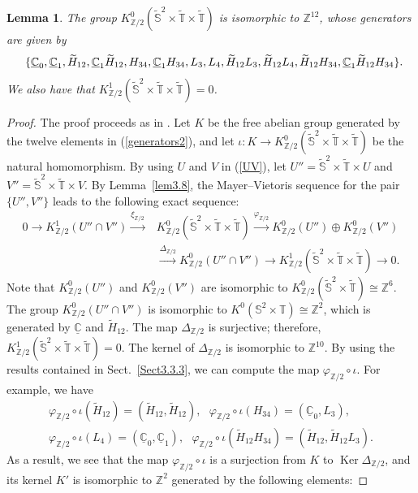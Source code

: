 \documentclass{amsart}
\theoremstyle{plain}
\newtheorem{lemma}[theorem]{Lemma}
\theoremstyle{definition}
\theoremstyle{remark}
\newcommand{\Z}{\mathbb{Z}}
\newcommand{\C}{\mathbb{C}}
\newcommand{\T}{\mathbb{T}}
\newcommand{\SSS}{\mathbb{S}}
\newcommand{\tT}{\widetilde{\T}}
\newcommand{\tS}{\widetilde{\SSS}}
\newcommand{\tH}{\widetilde{H}}
\newcommand{\uC}{\underline{\C}}
\DeclareMathOperator{\Ker}{\mathrm{Ker}}
\begin{document}
\begin{lemma}
\label{S2S1S1}
The group $K^0_{\Z/2}(\tS^2 \times \tT \times \tT)$ is isomorphic to $\Z^{12}$, whose generators are given by
\begin{equation}
\label{generators2}
	\{ \uC_0, \uC_1, \tH_{12}, \uC_1\tH_{12}, H_{34}, \uC_1H_{34}, L_3, L_4,
	\tH_{12} L_3, \tH_{12} L_4, \tH_{12} H_{34}, \uC_1 \tH_{12} H_{34}\}. \hspace{-2mm}
\end{equation}
We also have that
$K^1_{\Z/2}(\tS^2 \times \tT \times \tT) = 0$.
\end{lemma}

\begin{proof}
The proof proceeds as in \cite[Lemma~4.4]{Gomi15}.
Let $K$ be the free abelian group generated by the twelve elements in (\ref{generators2}), and let $\iota \colon K \to K^0_{\Z/2}(\tS^2 \times \tT \times \tT)$ be the natural homomorphism.
By using $U$ and $V$ in (\ref{UV}), let $U'' = \tS^2 \times \tT \times U$ and $V'' = \tS^2 \times \tT \times V$.
By Lemma~\ref{lem3.8}, the Mayer--Vietoris sequence for the pair $\{ U'', V'' \}$ leads to the following exact sequence:
\begin{align*}
0 \to K^1_{\Z/2}(U'' \cap V'') \overset{\xi_{\Z/2}}{\longrightarrow} &K^0_{\Z/2}(\tS^2 \times \tT \times \tT) \overset{\varphi_{\Z/2}}{\longrightarrow} K^0_{\Z/2}(U'') \oplus K^0_{\Z/2}(V'')\\
	&\overset{\Delta_{\Z/2}}{\longrightarrow} K^0_{\Z/2}(U'' \cap V'') \to K^1_{\Z/2}(\tS^2 \times \tT \times \tT) \to 0.
\end{align*}
Note that $K^0_{\Z/2}(U'')$ and $K^0_{\Z/2}(V'')$ are isomorphic to $K^0_{\Z/2}(\tS^2 \times \tT) \cong \Z^6$.
The group $K^0_{\Z/2}(U'' \cap V'')$ is isomorphic to $K^0(\SSS^2 \times \T) \cong \Z^2$, which is generated by $\uC$ and $\tH_{12}$.
The map $\Delta_{\Z/2}$ is surjective; therefore, $K^1_{\Z/2}(\tS^2 \times \tT \times \tT) = 0$.
The kernel of $\Delta_{\Z/2}$ is isomorphic to $\Z^{10}$.
By using the results contained in Sect.~\ref{Sect3.3.3}, we can compute the map $\varphi_{\Z/2} \circ \iota$.
For example, we have
\begin{gather*}
	\varphi_{\Z/2} \circ \iota(\tH_{12}) = (\tH_{12}, \tH_{12}), \ \ \
	\varphi_{\Z/2} \circ \iota(H_{34}) = (\uC_0, L_3),\\
	\varphi_{\Z/2} \circ \iota(L_4) = (\uC_0, \uC_1),\ \ \
	\varphi_{\Z/2} \circ \iota(\tH_{12}H_{34}) = (\tH_{12}, \tH_{12}L_3).
\end{gather*}
As a result, we see that the map $\varphi_{\Z/2} \circ \iota$ is a surjection from $K$ to $\Ker \Delta_{\Z/2}$, and its kernel $K'$ is isomorphic to $\Z^2$ generated by the following elements:

\end{proof}
\end{document}
